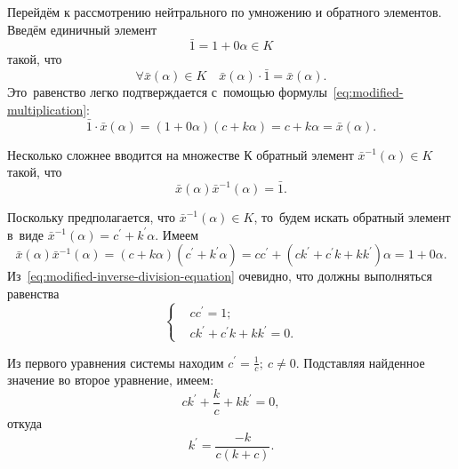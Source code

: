 Перейдём к рассмотрению нейтрального по умножению и обратного элементов. Введём единичный элемент
\begin{equation*}
  \bar{1}=1+0\alpha \in K
\end{equation*}
такой, что
\begin{equation*}
  \forall \bar{x}\left( \alpha  \right)\in K\quad \bar{x}\left( \alpha  \right)\cdot \bar{1}=\bar{x}\left( \alpha  \right).
\end{equation*}
Это~равенство легко подтверждается с~помощью формулы~\eqref{eq:modified-multiplication}:
\begin{equation*}
  \bar{1}\cdot \bar{x}(\alpha )=(1+0\alpha )(c+k\alpha )=c+k\alpha =\bar{x}(\alpha ).
\end{equation*}

Несколько сложнее вводится на множестве $К$ обратный элемент $\bar{x}^{-1}\left( \alpha  \right)\in K$ такой, что
\begin{equation*}
  \bar{x}\left( \alpha  \right){{\bar{x}}^{-1}}\left( \alpha  \right)=\bar{1}.
\end{equation*}

Поскольку предполагается, что $\bar{x}^{-1}\left( \alpha  \right)\in K$, то~будем искать обратный элемент в~виде $\bar{x}^{-1}\left( \alpha \right)=c^{'}+k^{'}\alpha$. Имеем
\begin{equation}
\label{eq:modified-inverse-division-equation}
  \bar{x}\left( \alpha  \right)\bar{x}^{-1}\left( \alpha  \right)=\left( c+k\alpha  \right)\left(c^{'}+k^{'}\alpha \right)=cc^{'}+\left(ck^{'}+c^{'}k+kk^{'}\right)\alpha =1+0\alpha.
\end{equation}
Из~\eqref{eq:modified-inverse-division-equation} очевидно, что должны выполняться равенства
\begin{equation*}
  \left\{ \begin{aligned}
    & cc^{'}=1; \\ 
    & ck^{'}+c^{'}k+kk^{'}=0.
  \end{aligned} \right.
\end{equation*}

Из первого уравнения системы находим $\displaystyle c^{'}=\frac{1}{c};\ c\ne 0$. Подставляя найденное значение во второе уравнение, имеем:
\begin{equation*}
  ck^{'}+\frac{k}{c}+kk^{'}=0,
\end{equation*}
откуда
\begin{equation*}
  k^{'}=\frac{-k}{c\left(k+c\right)}.
\end{equation*}

